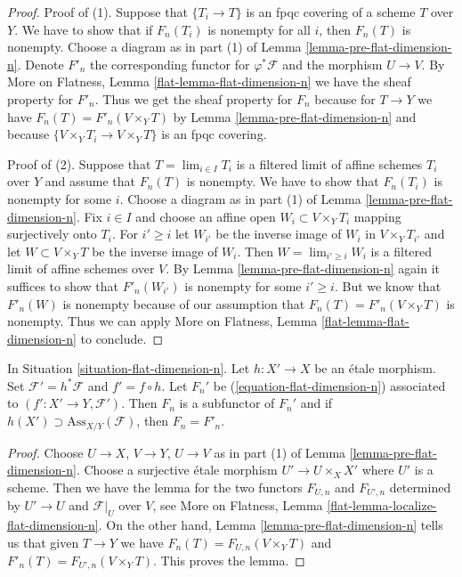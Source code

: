 \begin{proof}
Proof of (1). Suppose that $\{T_i \to T\}$ is an fpqc covering of
a scheme $T$ over $Y$. We have to show that if $F_n(T_i)$ is nonempty
for all $i$, then $F_n(T)$ is nonempty.
Choose a diagram as in part (1) of Lemma \ref{lemma-pre-flat-dimension-n}.
Denote $F'_n$ the corresponding functor for
$\varphi^*\mathcal{F}$ and the morphism $U \to V$.
By More on Flatness, Lemma \ref{flat-lemma-flat-dimension-n}
we have the sheaf property for $F'_n$.
Thus we get the sheaf property for $F_n$ because
for $T \to Y$ we have $F_n(T) = F'_n(V \times_Y T)$
by Lemma \ref{lemma-pre-flat-dimension-n}
and because $\{V \times_Y T_i \to V \times_Y T\}$
is an fpqc covering.

\medskip\noindent
Proof of (2). Suppose that $T = \lim_{i \in I} T_i$ is a filtered limit
of affine schemes $T_i$ over $Y$ and assume that $F_n(T)$ is nonempty.
We have to show that $F_n(T_i)$ is nonempty for some $i$.
Choose a diagram as in
part (1) of Lemma \ref{lemma-pre-flat-dimension-n}.
Fix $i \in I$ and choose an affine open $W_i \subset V \times_Y T_i$
mapping surjectively onto $T_i$. For $i' \geq i$ let $W_{i'}$
be the inverse image of $W_i$ in $V \times_Y T_{i'}$ and
let $W \subset V \times_Y T$ be the inverse image of $W_i$.
Then $W = \lim_{i' \geq i} W_i$ is a filtered limit of affine
schemes over $V$. By
Lemma \ref{lemma-pre-flat-dimension-n} again
it suffices to show that $F'_n(W_{i'})$ is nonempty for
some $i' \geq i$. But we know that $F'_n(W)$ is nonempty
because of our assumption that $F_n(T) = F'_n(V \times_Y T)$
is nonempty. Thus we can apply
More on Flatness, Lemma \ref{flat-lemma-flat-dimension-n}
to conclude.
\end{proof}

\begin{lemma}
\label{lemma-localize-flat-dimension-n}
In Situation \ref{situation-flat-dimension-n}.
Let $h : X' \to X$ be an \'etale morphism.
Set $\mathcal{F}' = h^*\mathcal{F}$ and $f' = f \circ h$.
Let $F_n'$ be (\ref{equation-flat-dimension-n})
associated to $(f' : X' \to Y, \mathcal{F}')$.
Then $F_n$ is a subfunctor of $F_n'$ and if
$h(X') \supset \text{Ass}_{X/Y}(\mathcal{F})$, then $F_n = F'_n$.
\end{lemma}

\begin{proof}
Choose $U \to X$, $V \to Y$, $U \to V$ as in part (1) of
Lemma \ref{lemma-pre-flat-dimension-n}. Choose a surjective
\'etale morphism $U' \to U \times_X X'$ where $U'$ is a scheme.
Then we have the lemma for the two functors
$F_{U, n}$ and $F_{U', n}$ determined by $U' \to U$ and $\mathcal{F}|_U$
over $V$, see
More on Flatness, Lemma \ref{flat-lemma-localize-flat-dimension-n}.
On the other hand, Lemma \ref{lemma-pre-flat-dimension-n}
tells us that given $T \to Y$ we have
$F_n(T) = F_{U, n}(V \times_Y T)$
and
$F'_n(T) = F_{U', n}(V \times_Y T)$.
This proves the lemma.
\end{proof}

